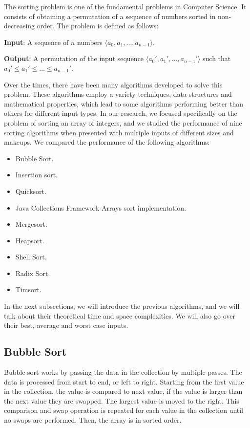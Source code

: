 The sorting problem is one of the fundamental problems in Computer Science. It consists of obtaining a permutation of a sequence of numbers sorted in non-decreasing order. The problem is defined as follows\cite{clrs2009}:

\textbf{Input}: A sequence of $n$ numbers $\langle a_0, a_1, ..., a_{n-1} \rangle$.

\textbf{Output}: A permutation of the input sequence $\langle a_0', a_1', ..., a_{n-1}' \rangle$ such that $a_0' \leq a_1' \leq ... \leq a_{n-1}'$.

Over the times, there have been many algorithms developed to solve this problem. These algorithms employ a variety techniques, data structures and mathematical properties, which lead to some algorithms performing better than others for different input types. In our research, we focused specifically on the problem of sorting an array of integers, and we studied the performance of nine sorting algorithms when presented with multiple inputs of different sizes and makeups. We compared the performance of the following algorithms:

\begin{itemize}
  \item Bubble Sort.
  \item Insertion sort.
  \item Quicksort.
  \item Java Collections Framework Arrays sort implementation.
  \item Mergesort.
  \item Heapsort.
  \item Shell Sort.
  \item Radix Sort.
  \item Timsort.
\end{itemize}

In the next subsections, we will introduce the previous algorithms, and we will talk about their theoretical time and space complexities. We will also go over their best, average and worst case inputs.


\subsection{Bubble Sort}

Bubble sort works by passing the data in the collection by multiple passes. The data is processed from start to end, or left to right. Starting from the first value in the collection, the value is compared to next value, if the value is larger than the next value they are swapped. The largest value is moved to the right. This comparison and swap operation is repeated for each value in the collection until no swaps are performed. Then, the array is in sorted order.

